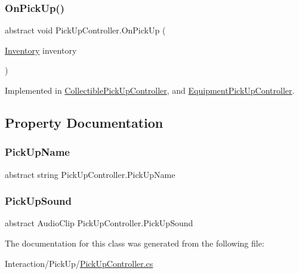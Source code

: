 \subsubsection{\texorpdfstring{On\+Pick\+Up()}{OnPickUp()}}
{\footnotesize\ttfamily abstract void Pick\+Up\+Controller.\+On\+Pick\+Up (\begin{DoxyParamCaption}\item[{\mbox{\hyperlink{class_inventory}{Inventory}}}]{inventory }\end{DoxyParamCaption})\hspace{0.3cm}{\ttfamily [pure virtual]}}



Implemented in \mbox{\hyperlink{class_collectible_pick_up_controller_af2d0389e1d3428399dcffed2df169b6f}{Collectible\+Pick\+Up\+Controller}}, and \mbox{\hyperlink{class_equipment_pick_up_controller_a010896ed927665505e88ce51d8f4067c}{Equipment\+Pick\+Up\+Controller}}.



\subsection{Property Documentation}
\mbox{\label{class_pick_up_controller_ab16ee19fb8d69f2c870cea6bfc60d325}} 
\subsubsection{\texorpdfstring{Pick\+Up\+Name}{PickUpName}}
{\footnotesize\ttfamily abstract string Pick\+Up\+Controller.\+Pick\+Up\+Name\hspace{0.3cm}{\ttfamily [get]}}

\mbox{\label{class_pick_up_controller_a9f36ceeb2b16c62bbc15958cc4f18eec}} 
\subsubsection{\texorpdfstring{Pick\+Up\+Sound}{PickUpSound}}
{\footnotesize\ttfamily abstract Audio\+Clip Pick\+Up\+Controller.\+Pick\+Up\+Sound\hspace{0.3cm}{\ttfamily [get]}}



The documentation for this class was generated from the following file\+:\begin{DoxyCompactItemize}
\item 
Interaction/\+Pick\+Up/\mbox{\hyperlink{_pick_up_controller_8cs}{Pick\+Up\+Controller.\+cs}}\end{DoxyCompactItemize}
